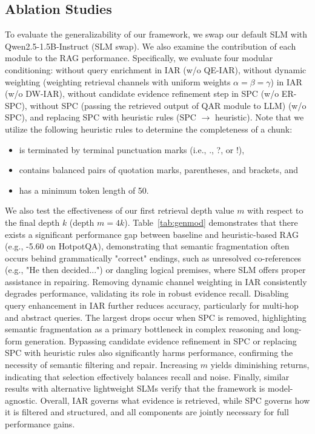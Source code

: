 \subsection{Ablation Studies}

To evaluate the generalizability of our framework, we swap our default SLM with Qwen2.5-1.5B-Instruct (SLM swap).
We also examine the contribution of each module to the RAG performance.
Specifically, we evaluate four modular conditioning: without query enrichment in IAR (w/o QE-IAR), without dynamic weighting (weighting retrieval channels with uniform weights $\alpha=\beta=\gamma$) in IAR (w/o DW-IAR), without candidate evidence refinement step in SPC (w/o ER-SPC), without SPC (passing the retrieved output of QAR module to LLM) (w/o SPC), and replacing SPC with heuristic rules (SPC $\xrightarrow{}$ heuristic).
Note that we utilize the following heuristic rules to determine the completeness of a chunk:
\begin{itemize}
    \item is terminated by terminal punctuation marks (i.e., ., ?, or !),
    \item contains balanced pairs of quotation marks, parentheses, and brackets, and
    \item has a minimum token length of 50.
\end{itemize}
We also test the effectiveness of our first retrieval depth value $m$ with respect to the final depth $k$ (depth $m=4k$).
Table~\ref{tab:genmod} demonstrates that there exists a significant performance gap between baseline and heuristic-based RAG (e.g., -5.60 on HotpotQA), demonstrating that semantic fragmentation often occurs behind grammatically "correct" endings, such as unresolved co-references (e.g., "He then decided...") or dangling logical premises, where SLM offers proper assistance in repairing.
Removing dynamic channel weighting in IAR consistently degrades performance, validating its role in robust evidence recall. 
Disabling query enhancement in IAR further reduces accuracy, particularly for multi-hop and abstract queries. 
The largest drops occur when SPC is removed, highlighting semantic fragmentation as a primary bottleneck in complex reasoning and long-form generation.
Bypassing candidate evidence refinement in SPC or replacing SPC with heuristic rules also significantly harms performance, confirming the necessity of semantic filtering and repair. 
Increasing $m$ yields diminishing returns, indicating that selection effectively balances recall and noise. 
Finally, similar results with alternative lightweight SLMs verify that the framework is model-agnostic. 
Overall, IAR governs what evidence is retrieved, while SPC governs how it is filtered and structured, and all components are jointly necessary for full performance gains.







